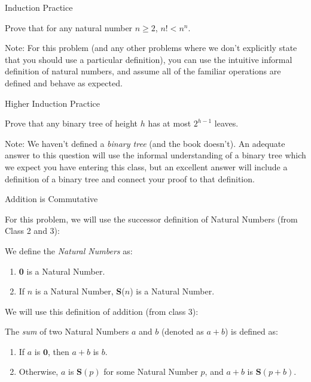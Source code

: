 \documentclass[11pt]{article}
\begin{document}
\begin{problem}
Induction Practice
\end{problem}
Prove that for any natural number $n\geq 2$, $n! < n^{n}$. 

\begin{directions} 
Note: For this problem (and any other problems where we don't explicitly state that you should use a particular definition), you can use the intuitive informal definition of natural numbers, and assume all of the familiar operations are defined and behave as expected. \end{directions}

\begin{problem}
Higher Induction Practice
\end{problem}
Prove that any binary tree of height $h$ has at most $2^{h-1}$ leaves.

\begin{directions}
Note: We haven't defined a \emph{binary tree} (and the book doesn't). An adequate answer to this question will use the informal understanding of a binary tree which we expect you have entering this class, but an excellent answer will include a definition of a binary tree and connect your proof to that definition. 
\end{directions}

\begin{problem}
Addition is Commutative 
\end{problem}
\begin{directions}
For this problem, we will use the successor definition of Natural Numbers (from Class 2 and 3):

\begin{definition}
\normalfont 
We define the \emph{Natural Numbers} as:
\begin{enumerate}
\item {\bf 0} is a Natural Number.
\item If $n$ is a Natural Number, {\bf S}($n$) is a Natural Number.
\end{enumerate}
\end{definition}
We will use this definition of addition (from class 3):
\begin{definition}[Sum]
\normalfont
The \emph{sum} of two Natural Numbers $a$ and $b$ (denoted as $a + b$) is defined as:
\begin{enumerate}
\item If $a$ is $\textbf{0}$, then $a + b$ is $b$.
\item Otherwise, $a$ is $\textbf{S}(p)$ for some Natural Number $p$, and $a + b$ is $\textbf{S}(p + b)$.
\end{enumerate}
\end{definition}
\end{directions}
\end{document}
